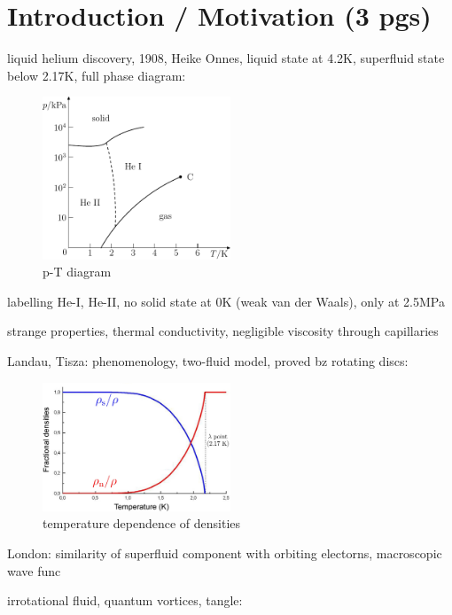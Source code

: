 \chapter*{Introduction / Motivation (3 pgs)}

	liquid helium discovery, 1908, Heike Onnes, liquid state at 4.2K, superfluid state below 2.17K, full phase diagram:

	\begin{figure}[h]
		\centering
		\includegraphics[width=0.5\textwidth]{graphics/phase_diag}
		\caption{p-T diagram}
		\label{phase}
	\end{figure}

	labelling He-I, He-II, no solid state at 0K (weak van der Waals), only at 2.5MPa

	strange properties, thermal conductivity, negligible viscosity through capillaries

	Landau, Tisza: phenomenology, two-fluid model, proved bz rotating discs:

	\begin{figure}[h]
		\centering
		\includegraphics[width=0.5\textwidth]{graphics/densities}
		\caption{temperature dependence of densities}
		\label{densities}
	\end{figure}

	London: similarity of superfluid component with orbiting electorns, macroscopic wave func

	irrotational fluid, quantum vortices, tangle:

